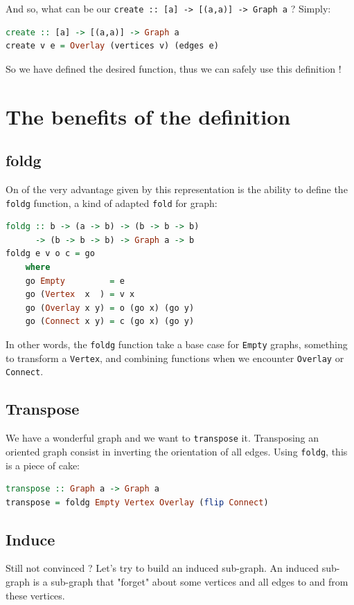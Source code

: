 \documentclass[10pt,a4paper]{article}
\begin{document}
And so, what can be our \verb|create :: [a] -> [(a,a)] -> Graph a| ? Simply:
\begin{lstlisting}[language=Haskell, frame=single]
create :: [a] -> [(a,a)] -> Graph a
create v e = Overlay (vertices v) (edges e)
\end{lstlisting}

So we have defined the desired function, thus we can safely use this definition !

\section{The benefits of the definition}
\subsection{foldg}
On of the very advantage given by this representation is the ability to define the \verb|foldg| function, a kind of adapted \verb|fold| for graph:
\begin{lstlisting}[language=Haskell, frame=single]
foldg :: b -> (a -> b) -> (b -> b -> b)
      -> (b -> b -> b) -> Graph a -> b
foldg e v o c = go
	where
	go Empty         = e
	go (Vertex  x  ) = v x
	go (Overlay x y) = o (go x) (go y)
	go (Connect x y) = c (go x) (go y)
\end{lstlisting}
In other words, the \verb|foldg| function take a base case for \verb|Empty| graphs, something to transform a \verb|Vertex|, and combining functions when we encounter \verb|Overlay| or \verb|Connect|.

\subsection{Transpose}

We have a wonderful graph and we want to \verb|transpose| it. Transposing an oriented graph consist in inverting the orientation of all edges. Using \verb|foldg|, this is a piece of cake:

\begin{lstlisting}[language=Haskell, frame=single]
transpose :: Graph a -> Graph a
transpose = foldg Empty Vertex Overlay (flip Connect)
\end{lstlisting}

\subsection{Induce}

Still not convinced ? Let's try to build an induced sub-graph. An induced sub-graph is a sub-graph that "forget" about some vertices and all edges to and from these vertices.
\end{document}
